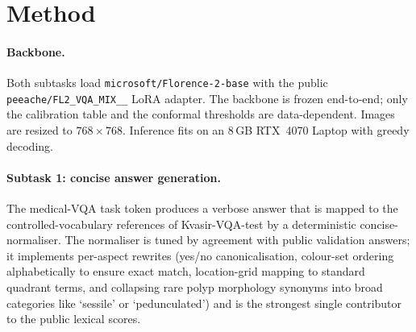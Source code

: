 \documentclass{ceurart}
\begin{document}
\section{Method}\label{sec:method}

\paragraph{Backbone.}
Both subtasks load \texttt{microsoft/Florence-2-base} with the
public \texttt{peeache/\allowbreak FL2\_\allowbreak VQA\_\allowbreak MIX\_\_} LoRA adapter. The
backbone is frozen end-to-end; only the calibration table and the
conformal thresholds are data-dependent. Images are resized to
$768\times768$. Inference fits on an 8\,GB RTX~4070 Laptop with
greedy decoding.

\paragraph{Subtask 1: concise answer generation.}
The medical-VQA task token produces a verbose answer that is mapped
to the controlled-vocabulary references of Kvasir-VQA-test by a
deterministic concise-normaliser. The normaliser is tuned by
agreement with public validation answers; it implements per-aspect
rewrites (yes/no canonicalisation, colour-set ordering alphabetically to ensure exact match, location-grid
mapping to standard quadrant terms, and collapsing rare polyp morphology synonyms into broad categories like `sessile' or `pedunculated') and is the strongest single
contributor to the public lexical scores.
\end{document}

